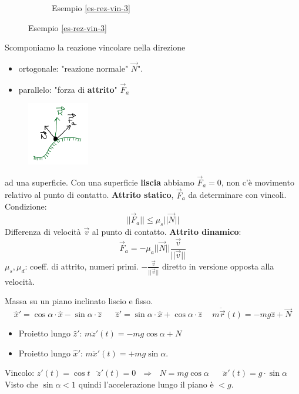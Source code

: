 \begin{figure}[h!]
\begin{subfigure}[b]{0.2\textwidth}
        \caption*{Esempio \ref{es-rez-vin-3}}
    \end{subfigure}
\end{figure}
\hspace{-15pt}Scomponiamo la reazione vincolare nella direzione
\begin{itemize}
    \item ortogonale: "reazione normale" $\vec{N}$".
    \item parallelo: "forza di \textbf{attrito}" $\vec{F}_a$
\end{itemize}
\newpage
\begin{figure}
    \centering
    \includegraphics[width=2.7cm]{images/scomposizione-reazione-vincolare.png}
\end{figure}
ad una superficie. Con una superficie \textbf{liscia} abbiamo $\vec{F}_a = 0$, non c'è
movimento relativo al punto di contatto.
\textbf{Attrito statico}, $\vec{F}_a$ da determinare con vincoli. Condizione: $$||\vec{F}_a|| \leq \mu_s ||\vec{N}||$$
Differenza di velocità $\vec{v}$ al punto di contatto. \textbf{Attrito dinamico}:
$$\vec{F}_a = -\mu_a ||\vec{N}||\frac{\vec{v}}{||\vec{v}||}$$
$\mu_s, \mu_d$: coeff. di attrito, numeri primi.
$-\frac{\vec{v}}{||\vec{v}||}$ diretto in versione opposta alla velocità.

\begin{example}\label{es-rez-vin-4}
    Massa su un piano inclinato liscio e fisso.
    $$\hat{x}' = \cos\alpha \cdot \hat{x} - \sin\alpha \cdot \hat{z} \hspace{20pt}\hat{z}' = \sin\alpha \cdot \hat{x} + \cos\alpha \cdot \hat{z} \hspace{15pt} m\ddot{\vec{r}}(t) = -mg\hat{z} + \vec{N}$$
    \begin{itemize}
        \item Proietto lungo $\hat{z}'$: \hspace{15pt} $m\ddot{z}'(t) = -mg\cos\alpha + N$
        \item Proietto lungo $\hat{x}'$: \hspace{15pt} $m\ddot{x}'(t) = +mg\sin\alpha$.
    \end{itemize}
    Vincolo: $z'(t) = \cos t \hspace{10pt} \ddot{z}'(t) = 0\:\:\: \Rightarrow\:\:\: N = mg\cos\alpha \hspace{20pt} \ddot{x}'(t) = g \cdot \sin\alpha$\\
    Visto che $\sin\alpha < 1$ quindi l'accelerazione lungo il piano è $< g$.
\end{example}

